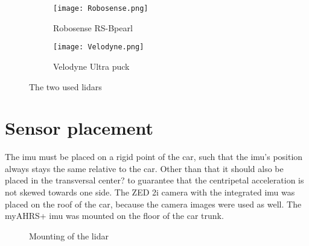 \begin{figure}[htb]
	\centering
	\begin{subfigure}{0.3\textwidth}
		\centering
		\texttt{[image: Robosense.png]}
		\caption{Robosense RS-Bpearl \cite{RoboSense2020}}
		\label{fig:lidar_robosense}
	\end{subfigure}
	\begin{subfigure}{0.3\textwidth}
		\centering
		\texttt{[image: Velodyne.png]}
		\caption{Velodyne Ultra puck \cite{Velodyne2018}}
		\label{fig:lidar_velodyne}
	\end{subfigure}
	\caption{The two used \gls{lidar}s}
	\label{fig:lidars_used}
\end{figure}



\section{Sensor placement}
The \gls{imu} must be placed on a rigid point of the car, such that the \gls{imu}'s position always stays the same relative to the car.
Other than that it should also be placed in the transversal center? to guarantee that the centripetal acceleration is not skewed towards one side.
The ZED 2i camera with the integrated \gls{imu} was placed on the roof of the car, because the camera images were used as well.
The myAHRS+ \gls{imu} was mounted on the floor of the car trunk.\\
\begin{figure}[htpb]
	\centering
	
	\caption{Mounting of the \acrshort{lidar}}
	\label{fig:tikz_lidar_mount}
\end{figure}

